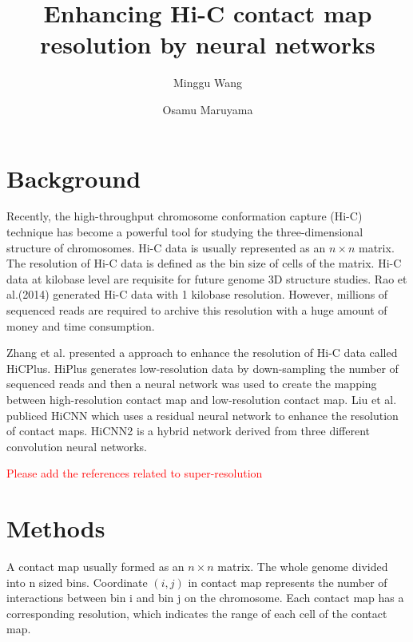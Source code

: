 \documentclass[a4paper,12pt]{article}
\begin{document}
\title{Enhancing Hi-C contact map resolution by neural networks}
\author{Minggu Wang \and Osamu Maruyama}
\maketitle

\section{Background}

Recently, the high-throughput chromosome conformation capture (Hi-C) technique has 
become a powerful tool for studying the three-dimensional structure of chromosomes. 
Hi-C data is usually represented as an $n \times n$ matrix. 
The resolution of Hi-C data is defined as the bin size of cells of the matrix. 
Hi-C data at kilobase level are requisite for future genome 3D structure studies. 
Rao et al.(2014) \cite{Rao2014} generated Hi-C data with 1 kilobase resolution. However, millions of sequenced reads are required to archive this resolution with a huge amount of money and time consumption.

Zhang et al. \cite{Zhang2018} presented a approach to enhance the resolution of Hi-C data called HiCPlus. 
HiPlus generates low-resolution data by down-sampling the number of sequenced reads and then a neural network was used to create the mapping between high-resolution contact map and low-resolution contact map. 
Liu et al. publiced HiCNN \cite{Liu2019} which uses a residual neural network to enhance the resolution of contact maps. 
HiCNN2 \cite{Liu2019a} is a hybrid network derived from three different convolution neural networks.  

\textcolor{red}{Please add the references related to super-resolution}



\section{Methods}
A contact map usually formed as  an $n \times n$ matrix. The whole genome divided into n sized bins. Coordinate $(i,j)$ in contact map represents the number of interactions between bin i and bin j on the chromosome. Each contact map has a corresponding resolution, which indicates the range of each cell of the contact map.
\end{document}
